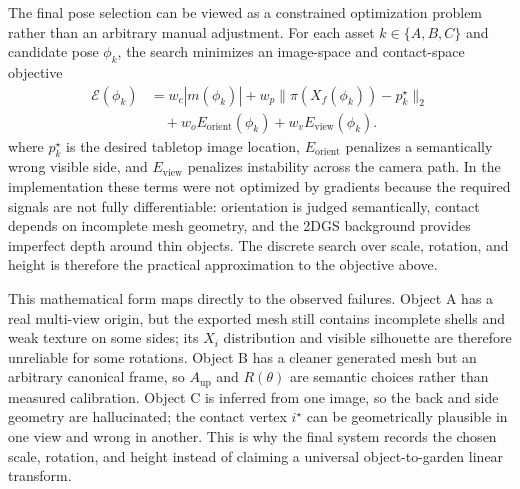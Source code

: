 \documentclass[10pt,twocolumn,letterpaper]{article}
\begin{document}
The final pose selection can be viewed as a constrained optimization problem rather than an arbitrary manual adjustment.
For each asset $k\in\{A,B,C\}$ and candidate pose $\phi_k$, the search minimizes an image-space and contact-space objective
\[
\begin{aligned}
\mathcal{E}(\phi_k)
&=
w_c|m(\phi_k)|
+w_p\|\pi(X_f(\phi_k))-p_k^\star\|_2\\
&\quad
+w_oE_{\mathrm{orient}}(\phi_k)
+w_vE_{\mathrm{view}}(\phi_k).
\end{aligned}
\]
where $p_k^\star$ is the desired tabletop image location, $E_{\mathrm{orient}}$ penalizes a semantically wrong visible side, and $E_{\mathrm{view}}$ penalizes instability across the camera path.
In the implementation these terms were not optimized by gradients because the required signals are not fully differentiable: orientation is judged semantically, contact depends on incomplete mesh geometry, and the 2DGS background provides imperfect depth around thin objects.
The discrete search over scale, rotation, and height is therefore the practical approximation to the objective above.

This mathematical form maps directly to the observed failures.
Object A has a real multi-view origin, but the exported mesh still contains incomplete shells and weak texture on some sides; its $X_i$ distribution and visible silhouette are therefore unreliable for some rotations.
Object B has a cleaner generated mesh but an arbitrary canonical frame, so $A_{\mathrm{up}}$ and $R(\theta)$ are semantic choices rather than measured calibration.
Object C is inferred from one image, so the back and side geometry are hallucinated; the contact vertex $i^\star$ can be geometrically plausible in one view and wrong in another.
This is why the final system records the chosen scale, rotation, and height instead of claiming a universal object-to-garden linear transform.
\end{document}
